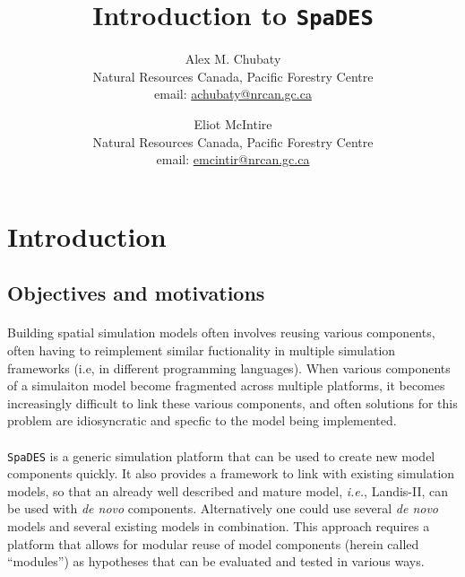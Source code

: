 \documentclass{article}
\title{Introduction to \texttt{SpaDES}}
\author{
  Alex M. Chubaty\\
	\small{Natural Resources Canada, Pacific Forestry Centre}\\
	\small{email: \href{mailto:achubaty@nrcan.gc.ca}{achubaty@nrcan.gc.ca}}
	\and
	Eliot McIntire\\
	\small{Natural Resources Canada, Pacific Forestry Centre}\\
	\small{email: \href{mailto:emcintir@nrcan.gc.ca}{emcintir@nrcan.gc.ca}}
}
\begin{document}


\maketitle


\tableofcontents

\newpage

\section{Introduction}

\subsection{Objectives and motivations}

\paragraph{}
Building spatial simulation models often involves reusing various components, often having to reimplement similar fuctionality in multiple simulation frameworks (i.e, in different programming languages). When various components of a simulaiton model become fragmented across multiple platforms, it becomes increasingly difficult to link these various components, and often solutions for this problem are idiosyncratic and specfic to the model being implemented.

\paragraph{}
\texttt{SpaDES} is a generic simulation platform that can be used to create new model components quickly. It also provides a framework to link with existing simulation models, so that an already well described and mature model, \textit{i.e.}, Landis-II, can be used with \textit{de novo} components. Alternatively one could use several \textit{de novo} models and several existing models in combination. This approach requires a platform that allows for modular reuse of model components (herein called ``modules'') as hypotheses that can be evaluated and tested in various ways.
\end{document}
